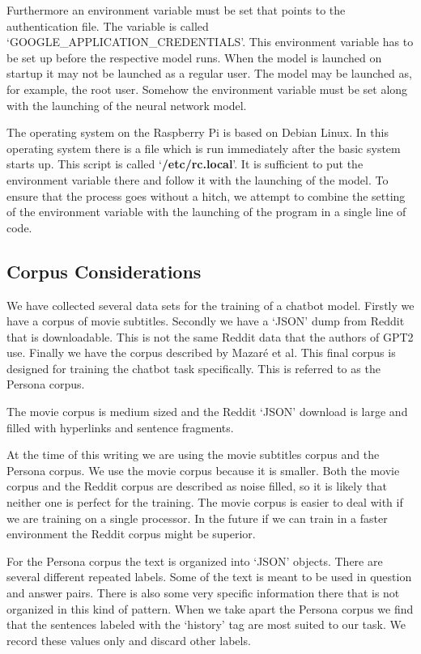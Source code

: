 Furthermore an environment variable must be set that points to the authentication file. The variable is called `GOOGLE\_APPLICATION\_CREDENTIALS'. This environment variable has to be set up before the respective model runs. When the model is launched on startup it may not be launched as a regular user. The model may be launched as, for example, the root user. Somehow the environment variable must be set along with the launching of the neural network model.

The operating system on the Raspberry Pi is based on Debian Linux. In this operating system there is a file which is run immediately after the basic system starts up. This script is called `\textbf{/etc/rc.local}'. It is sufficient to put the environment variable there and follow it with the launching of the model. To ensure that the process goes without a hitch, we attempt to combine the setting of the environment variable with the launching of the program in a single line of code.

\subsection{Corpus Considerations}

We have collected several data sets for the training of a chatbot model. Firstly we have a corpus of movie subtitles. Secondly we have a `JSON' dump from Reddit that is downloadable.  This is not the same Reddit data that the authors of GPT2 use. Finally we have the corpus described by Mazar{\'{e}} et al\cite{DBLP:journals/corr/abs-1809-01984}. This final corpus is designed for training the chatbot task specifically. This is referred to as the Persona corpus.

The movie corpus is medium sized and the Reddit `JSON' download is large and filled with hyperlinks and sentence fragments. 

At the time of this writing we are using the movie subtitles corpus and the Persona corpus. We use the movie corpus because it is smaller. Both the movie corpus and the Reddit corpus are described as noise filled, so it is likely that neither one is perfect for the training. The movie corpus is easier to deal with if we are training on a single processor. In the future if we can train in a faster environment the Reddit corpus might be superior.

For the Persona corpus the text is organized into `JSON' objects. There are several different repeated labels. Some of the text is meant to be used in question and answer pairs. There is also some very specific information there that is not organized in this kind of pattern. When we take apart the Persona corpus we find that the sentences labeled with the `history' tag are most suited to our task. We record these values only and discard other labels.

